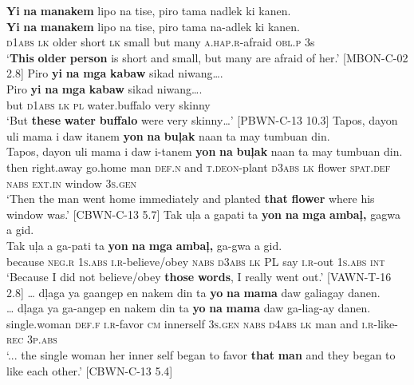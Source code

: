 \newpage
\ea
\label{bkm:Ref343578428}
\textbf{Yi}  \textbf{na}  \textbf{manakem}  lipo  na  tise,  piro  tama  nadlek  ki kanen. \\\smallskip
 \gll \textbf{Yi}  \textbf{na} \textbf{manakem}  lipo  na  tise,  piro  tama  na-adlek  ki kanen. \\
\textsc{d}1\textsc{abs}  \textsc{lk}  older  short  \textsc{lk}  small  but  many \textsc{a.hap.r}-afraid  \textsc{obl.p} 3s \\
\glt ‘\textbf{This} \textbf{older} \textbf{person} is short and small, but many are afraid of her.’ [MBON-C-02 2.8]
\z
\ea
Piro  \textbf{yi}  \textbf{na}  \textbf{mga}  \textbf{kabaw}  sikad  niwang…. \\\smallskip
 \gll Piro  \textbf{yi}  \textbf{na}  \textbf{mga}  \textbf{kabaw}  sikad  niwang…. \\
but  \textsc{d}1\textsc{abs}  \textsc{lk}  \textsc{pl}  water.buffalo  very  skinny \\
\glt ‘But \textbf{these} \textbf{water} \textbf{buffalo} were very skinny…’ [PBWN-C-13 10.3]
\z
\ea
Tapos,  dayon  uli  mama  i  daw  itanem  \textbf{yon}  \textbf{na}  \textbf{buļak} naan  ta  may  tumbuan  din. \\\smallskip
 \gll Tapos,  dayon  uli  mama  i  daw  i-tanem  \textbf{yon}  \textbf{na}  \textbf{buļak} naan  ta  may  tumbuan  din. \\
then  right.away  go.home  man  \textsc{def.n}  and  \textsc{t.deon}-plant  \textsc{d}3\textsc{abs}  \textsc{lk}  flower \textsc{spat.def}  \textsc{nabs}  \textsc{ext.in}  window  3\textsc{s.gen} \\
\glt `Then the man went home immediately and  planted \textbf{that} \textbf{flower} where his window was.’ [CBWN-C-13 5.7]
\z
\ea
Tak  uļa  a  gapati  ta  \textbf{yon}  \textbf{na}  \textbf{mga}  \textbf{ambaļ,} gagwa  a  gid. \\\smallskip
 \gll Tak  uļa  a  ga-pati  ta  \textbf{yon}  \textbf{na}  \textbf{mga}  \textbf{ambaļ,} ga-gwa  a  gid. \\
because  \textsc{neg.r}  1\textsc{s.abs}  \textsc{i.r}-believe/obey  \textsc{nabs}  \textsc{d}3\textsc{abs}  \textsc{lk}  \textsc{PL}  say
\textsc{i.r-}out  1\textsc{s.abs}  \textsc{int} \\
\glt `Because I did not believe/obey \textbf{those} \textbf{words}, I really went out.’ [VAWN-T-16 2.8]
\z
\ea
\label{singlewoman}
… dļaga  ya  gaangep  en  nakem  din  ta  \textbf{yo}  \textbf{na} \textbf{mama}  daw  galiagay  danen. \\\smallskip
 \gll … dļaga  ya  ga-angep  en  nakem  din  ta  \textbf{yo}  \textbf{na} \textbf{mama}  daw  ga-liag-ay  danen. \\
{} single.woman  \textsc{def.f}  \textsc{i.r}-favor  \textsc{cm}  innerself  3\textsc{s.gen}  \textsc{nabs}  \textsc{d}4\textsc{abs}  \textsc{lk} man  and  \textsc{i.r}-like-\textsc{rec}  3\textsc{p.abs} \\
\glt `... the single woman her inner self began to favor \textbf{that} \textbf{man} and they began to like each other.’ [CBWN-C-13 5.4]
\z

